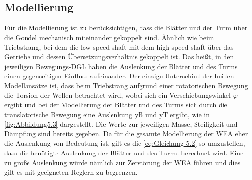 \subsection{Modellierung}

Für die Modellierung ist zu berücksichtigen, dass die Blätter und der Turm über die Gondel mechanisch miteinander gekoppelt sind. Ähnlich wie beim Triebstrang, bei dem die low speed shaft mit dem high speed shaft über das Getriebe und dessen Übersetzungsverhältnis gekoppelt ist. Das heißt, in den jeweiligen Bewegungs-DGL haben die Auslenkung der Blätter und des Turms einen gegenseitigen Einfluss aufeinander. Der einzige Unterschied der beiden Modellansätze ist, dass beim Triebstrang aufgrund einer rotatorischen Bewegung die Torsion der Wellen betrachtet wird, wobei sich ein Verschiebungswinkel $\varphi$ ergibt und bei der Modellierung der Blätter und des Turms sich durch die translatorische Bewegung eine Auslenkung \acs{yB} und \acs{yT} ergibt, wie in \autoref{fig:Abbildung5.3} dargestellt. Die Werte zur jeweiligen Masse, Steifigkeit und Dämpfung sind bereits gegeben. Da für die gesamte Modellierung der WEA eher die Auslenkung von Bedeutung ist, gilt es die \autoref{eq:Gleichung 5.2} so umzustellen, dass die benötigte Auslenkung der Blätter und des Turms berechnet wird. Eine zu große Auslenkung würde nämlich zur Zerstörung der WEA führen und dies gilt es mit geeigneten Reglern zu begrenzen. 

